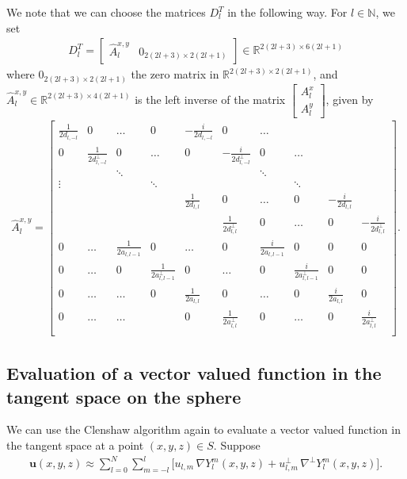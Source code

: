 \documentclass[11pt, oneside]{article}   	%
\newcommand{\R}{\mathbb{R}}
\newcommand{\N}{\mathbb{N}}
\newcommand{\gradYlm}{\nabla Y^m_l}
\newcommand{\gradpYlm}{\nabla^\perp Y^m_l}
\newcommand{\Dlt}{D^T_l}
\begin{document}
We note that we can choose the matrices \(\Dlt\) in the following way. For \(l \in \N\), we set
\begin{align}
\Dlt = \begin{bmatrix}
		\hat{A}^{x,y}_l & 0_{2(2l+3)\times2(2l+1)}
	  \end{bmatrix} \in \R^{2(2l+3)\times6(2l+1)}
\end{align}
where \(0_{2(2l+3)\times2(2l+1)}\) the zero matrix in \(\R^{2(2l+3)\times2(2l+1)}\), and \(\hat{A}^{x,y}_l \in \R^{2(2l+3)\times4(2l+1)}\) is the left inverse of the matrix \(\begin{bmatrix} A^x_l \\ A^y_l \end{bmatrix}\), given by
\begin{align}
\hat{A}^{x,y}_l = \begin{bmatrix}
		\frac{1}{2d_{l,-l}} & 0 & \hdots & 0 & -\frac{i}{2d_{l,-l}} & 0 & \hdots &  \\
		0 & \frac{1}{2d^\perp_{l,-l}} & 0 & \hdots & 0 & -\frac{i}{2d^\perp_{l,-l}} & 0 & \hdots &  \\
		& & \ddots & & & & \ddots & & \\
		\vdots & & & \ddots & & & & \ddots & \\
		& & & & \frac{1}{2d_{l,l}} & 0 & \hdots & 0 & -\frac{i}{2d_{l,l}} & \\
		& & & & & \frac{1}{2d^\perp_{l,l}} & 0 & \hdots & 0 & -\frac{i}{2d^\perp_{l,l}} \\
		0 & \hdots & \frac{1}{2a_{l,l-1}} & 0 & \hdots & 0 & \frac{i}{2a_{l,l-1}} & 0 & 0 & 0 \\
		0 & \hdots & 0 & \frac{1}{2a^\perp_{l,l-1}} & 0 & \hdots & 0 & \frac{i}{2a^\perp_{l,l-1}} & 0 & 0\\
		0 & \hdots & \hdots & 0 & \frac{1}{2a_{l,l}} & 0 & \hdots & 0 & \frac{i}{2a_{l,l}} & 0 \\
		0 & \hdots & \hdots & & 0 & \frac{1}{2a^\perp_{l,l}} & 0 & \hdots & 0 & \frac{i}{2a^\perp_{l,l}} \\
	  \end{bmatrix}.
\end{align}


\subsection{Evaluation of a vector valued function in the tangent space on the sphere}

We can use the Clenshaw algorithm again to evaluate a vector valued function in the tangent space at a point $(x,y,z) \in S$. Suppose
\begin{align}
\mathbf{u}(x,y,z) \approx \sum^N_{l=0} \sum^l_{m=-l} \big[u_{l,m} \, \gradYlm(x,y,z)  + u^\perp_{l,m} \, \gradpYlm(x,y,z) \big].
\end{align}
\end{document}
